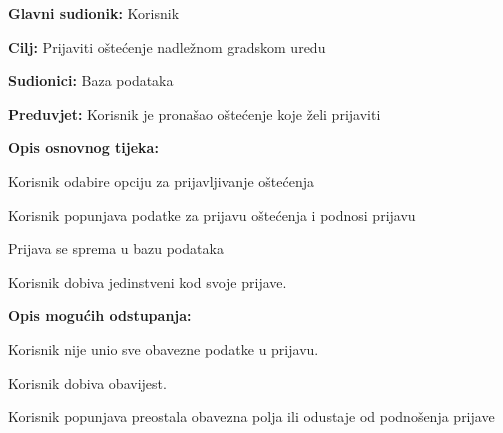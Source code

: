 					\noindent {}
					\begin{packed_item}
	
						\item \textbf{Glavni sudionik:} Korisnik
						\item  \textbf{Cilj:} Prijaviti oštećenje nadležnom gradskom uredu
						\item  \textbf{Sudionici:} Baza podataka
						\item  \textbf{Preduvjet:} Korisnik je pronašao oštećenje koje želi prijaviti
						
						\item  \textbf{Opis osnovnog tijeka:}
						\item[] \begin{packed_enum}
							\item Korisnik odabire opciju za prijavljivanje oštećenja
							\item Korisnik popunjava podatke za prijavu oštećenja i podnosi prijavu
							\item Prijava se sprema u bazu podataka
							\item Korisnik dobiva jedinstveni kod svoje prijave.
						\end{packed_enum}
						
						\item  \textbf{Opis mogućih odstupanja:}
						\item[] \begin{packed_item}
							\item[2.a] Korisnik nije unio sve obavezne podatke u prijavu.
							\item[] \begin{packed_enum}
								\item Korisnik dobiva obavijest.
								\item Korisnik popunjava preostala obavezna polja ili odustaje od podnošenja prijave
							\end{packed_enum}
							
						\end{packed_item}
					\end{packed_item}
					

